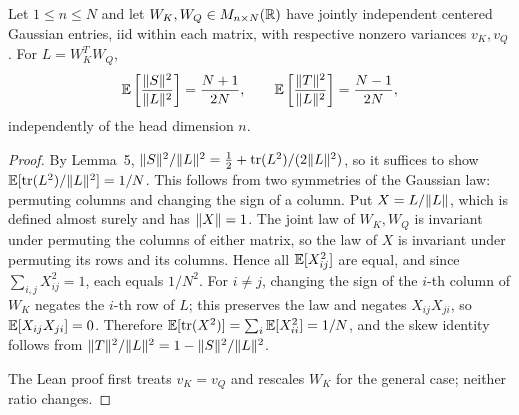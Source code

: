 \begin{proposition}
\label{prop:low-rank}
\leanok
{}
Let $1\le n\le N$ and let $W_K,W_Q\in M_{n\times N}(\mathbb{R})$ have
jointly independent centered Gaussian entries, iid within each matrix,
with respective nonzero variances $v_K,v_Q$. For $L=W_K^TW_Q$,
\[
 \mathbb{E}\left[\frac{\lVert S\rVert^2}{\lVert L\rVert^2}\right]=\frac{N+1}{2N},
 \qquad
 \mathbb{E}\left[\frac{\lVert T\rVert^2}{\lVert L\rVert^2}\right]=\frac{N-1}{2N},
\]
independently of the head dimension $n$.
\end{proposition}
\begin{proof}
\leanok
{}
By Lemma~5, $\lVert S\rVert^2/\lVert L\rVert^2=\tfrac12+\operatorname{tr}(L^2)/(2\lVert L\rVert^2)$, so it
suffices to show $\mathbb{E}[\operatorname{tr}(L^2)/\lVert L\rVert^2]=1/N$. This follows from two
symmetries of the Gaussian law: permuting columns and changing the sign
of a column. Put $X=L/\lVert L\rVert$, which is
defined almost surely and has $\lVert X\rVert=1$. The joint law of $W_K,W_Q$ is
invariant under permuting the columns of either matrix, so the law of $X$
is invariant under permuting its rows and its columns. Hence all
$\mathbb{E}[X_{ij}^2]$ are equal, and since $\sum_{i,j}X_{ij}^2=1$, each equals
$1/N^2$. For $i\ne j$, changing the sign of the $i$-th column of $W_K$
negates the $i$-th row of $L$; this preserves the law and negates
$X_{ij}X_{ji}$, so $\mathbb{E}[X_{ij}X_{ji}]=0$. Therefore
$\mathbb{E}[\operatorname{tr}(X^2)]=\sum_i\mathbb{E}[X_{ii}^2]=1/N$, and the skew identity follows from
$\lVert T\rVert^2/\lVert L\rVert^2=1-\lVert S\rVert^2/\lVert L\rVert^2$.

The Lean proof first treats $v_K=v_Q$ and rescales $W_K$ for the general
case; neither ratio changes.
\end{proof}

